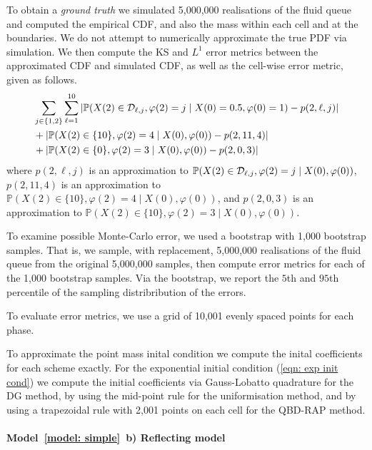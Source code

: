 To obtain a \emph{ground truth} we simulated 5,000,000 realisations of the fluid queue and computed the empirical CDF, and also the mass within each cell and at the boundaries. We do not attempt to numerically approximate the true PDF via simulation. We then compute the KS and \(L^1\) error metrics between the approximated CDF and simulated CDF, as well as the cell-wise error metric, given as follows. 
\begin{align}
	&\sum_{j\in\{1,2\}}\sum_{\ell=1}^{10} \left|\mathbb P(X(2)\in\mathcal{D}_{\ell,j}, \varphi(2)=j\mid X(0)=0.5,\varphi(0)=1)-p(2,\ell,j)\right|\nonumber 
	\\&+\left|\mathbb P(X(2)\in\{10\}, \varphi(2)=4\mid X(0),\varphi(0))-p(2,11,4)\right|\nonumber 
	\\&+\left|\mathbb P(X(2)\in\{0\}, \varphi(2)=3\mid X(0),\varphi(0))-p(2,0,3)\right| \label{eqn: cell errors 2}
\end{align}
where \(p(2,\ell,j)\) is an approximation to \(\mathbb P(X(2)\in\mathcal{D}_{\ell,j}, \varphi(2)=j\mid X(0),\varphi(0))\), \(p(2,11,4)\) is an approximation to \(\mathbb P(X(2)\in\{10\}, \varphi(2)=4\mid X(0),\varphi(0))\), and \(p(2,0,3)\) is an approximation to \(\mathbb P(X(2)\in\{10\}, \varphi(2)=3\mid X(0),\varphi(0))\). 

To examine possible Monte-Carlo error, we used a bootstrap with 1,000 bootstrap samples. That is, we sample, with replacement, 5,000,000 realisations of the fluid queue from the original 5,000,000 samples, then compute error metrics for each of the 1,000 bootstrap samples. Via the bootstrap, we report the \(5\)th and \(95\)th percentile of the sampling distribribution of the errors. 

To evaluate error metrics, we use a grid of 10,001 evenly spaced points for each phase. 

To approximate the point mass inital condition we compute the inital coefficients for each scheme exactly. For the exponential initial condition (\ref{eqn: exp init cond}) we compute the initial coefficients via Gauss-Lobatto quadrature for the DG method, by using the mid-point rule for the uniformisation method, and by using a trapezoidal rule with 2,001 points on each cell for the QBD-RAP method. 

\paragraph{Model~\ref{model: simple}~b) Reflecting model}

